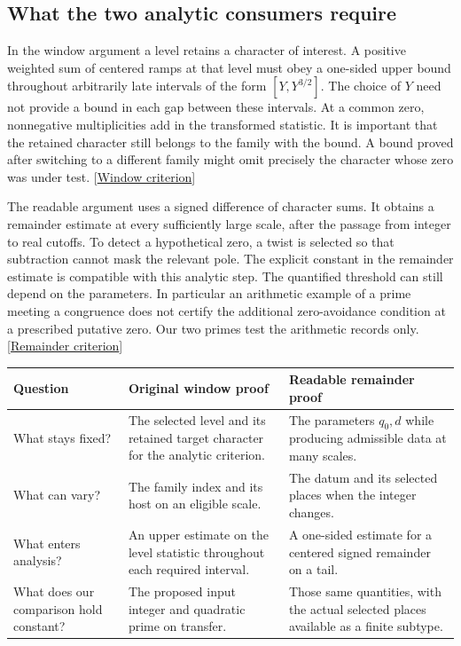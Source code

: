 \documentclass[12pt,letterpaper]{article}
\begin{document}
\subsection{What the two analytic consumers require}
In the window argument a level retains a character of interest. A positive weighted sum of centered ramps at that level must obey a one-sided upper bound throughout arbitrarily late intervals of the form $[Y,Y^{3/2}]$. The choice of $Y$ need not provide a bound in each gap between these intervals. At a common zero, nonnegative multiplicities add in the transformed statistic. It is important that the retained character still belongs to the family with the bound. A bound proved after switching to a different family might omit precisely the character whose zero was under test.  {\footnotesize\sffamily\color{mute}[\href{https://github.com/nousentllc/riemann-hypothesis/blob/40e56bab026552e089d7afcfeff08d2defb9c005/src/Development/AutomorphicArithmetic/DedekindLFunctions/LandauTheorems/ZeroFreeOfRpowWindow.lean\#L11}{Window criterion}]}

The readable argument uses a signed difference of character sums. It obtains a remainder estimate at every sufficiently large scale, after the passage from integer to real cutoffs. To detect a hypothetical zero, a twist is selected so that subtraction cannot mask the relevant pole. The explicit constant in the remainder estimate is compatible with this analytic step. The quantified threshold can still depend on the parameters. In particular an arithmetic example of a prime meeting a congruence does not certify the additional zero-avoidance condition at a prescribed putative zero. Our two primes test the arithmetic records only.  {\footnotesize\sffamily\color{mute}[\href{https://github.com/leanprover-community/riemann-hypothesis/blob/e063a923620ee7787b4a1270421478645bf66bdb/src/New/Reduction/Zeros/Criterion.lean\#L37}{Remainder criterion}]}

\begin{center}\small
\begin{tabularx}{\linewidth}{@{}p{.18\linewidth}YY@{}}\toprule
Question & Original window proof & Readable remainder proof\\\midrule
What stays fixed? & The selected level and its retained target character for the analytic criterion. & The parameters $q_0,d$ while producing admissible data at many scales.\\
What can vary? & The family index and its host on an eligible scale. & The datum and its selected places when the integer changes.\\
What enters analysis? & An upper estimate on the level statistic throughout each required interval. & A one-sided estimate for a centered signed remainder on a tail.\\
What does our comparison hold constant? & The proposed input integer and quadratic prime on transfer. & Those same quantities, with the actual selected places available as a finite subtype.\\\bottomrule
\end{tabularx}\end{center}
\end{document}
